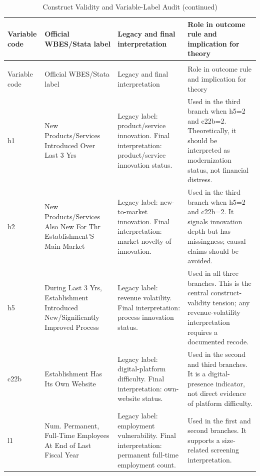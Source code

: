 \begin{longtable}{>{\RaggedRight\arraybackslash}p{1.5cm}>{\RaggedRight\arraybackslash}p{4.2cm}>{\RaggedRight\arraybackslash}p{4.0cm}>{\RaggedRight\arraybackslash}p{5.0cm}}
\caption{Construct Validity and Variable-Label Audit}
\label{tab:construct_audit}\\
\toprule
Variable code & Official WBES/Stata label & Legacy and final interpretation & Role in outcome rule and implication for theory \\
\midrule
\endfirsthead
\caption[]{Construct Validity and Variable-Label Audit (continued)}\\
\toprule
Variable code & Official WBES/Stata label & Legacy and final interpretation & Role in outcome rule and implication for theory \\
\midrule
\endhead
h1 & New Products/Services Introduced Over Last 3 Yrs & Legacy label: product/service innovation. Final interpretation: product/service innovation status. & Used in the third branch when h5=2 and c22b=2. Theoretically, it should be interpreted as modernization status, not financial distress. \\
h2 & New Products/Services Also New For Thr Establishment'S Main Market & Legacy label: new-to-market innovation. Final interpretation: market novelty of innovation. & Used in the third branch when h5=2 and c22b=2. It signals innovation depth but has missingness; causal claims should be avoided. \\
h5 & During Last 3 Yrs, Establishment Introduced New/Significantly Improved Process & Legacy label: revenue volatility. Final interpretation: process innovation status. & Used in all three branches. This is the central construct-validity tension; any revenue-volatility interpretation requires a documented recode. \\
c22b & Establishment Has Its Own Website & Legacy label: digital-platform difficulty. Final interpretation: own-website status. & Used in the second and third branches. It is a digital-presence indicator, not direct evidence of platform difficulty. \\
l1 & Num. Permanent, Full-Time Employees At End of Last Fiscal Year & Legacy label: employment vulnerability. Final interpretation: permanent full-time employment count. & Used in the first and second branches. It supports a size-related screening interpretation. \\
\bottomrule
\end{longtable}
